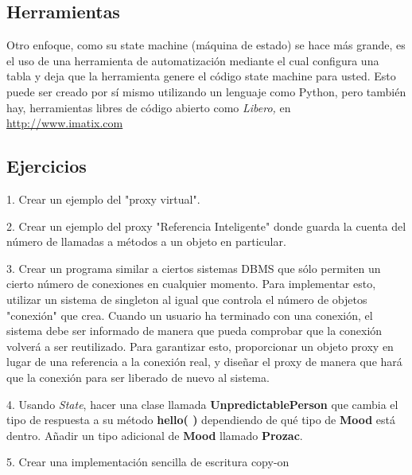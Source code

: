 \subsection*{Herramientas}
\label{subsec:Herramientas}

Otro enfoque, como su state machine (máquina de estado) se hace más grande, es el uso de una herramienta de automatización mediante el cual configura una tabla y deja que la herramienta genere el código state machine para usted. Esto puede ser creado por sí mismo utilizando un lenguaje como Python, pero también hay, herramientas libres de código abierto como \textit{ Libero,} en \textcolor[rgb]{0.2,0.5,0.7}{\underline{http://www.imatix.com}} \newline 


\subsection*{Ejercicios}
\label{subsec:Ejercicios}

1. Crear un ejemplo del "proxy virtual". \newline

2. Crear un ejemplo del proxy "Referencia Inteligente" donde guarda la cuenta del número de llamadas a métodos a un objeto en particular. \newline

3. Crear un programa similar a ciertos sistemas DBMS que sólo permiten un cierto número de conexiones en cualquier momento. Para implementar esto, utilizar un sistema de singleton al igual que controla el número de objetos "conexión" que crea. Cuando un usuario ha terminado con una conexión, el sistema debe ser informado de manera que pueda comprobar que la conexión volverá a ser reutilizado. Para garantizar esto, proporcionar un objeto proxy en lugar de una referencia a la conexión real, y diseñar el proxy de manera que hará que la conexión para ser liberado de nuevo al sistema.   \newline

4. Usando \textit{State}, hacer una clase llamada \textbf{UnpredictablePerson} que cambia el tipo de respuesta a su método \textbf{hello( )} dependiendo de qué tipo de \textbf{Mood} está dentro. Añadir un tipo adicional de \textbf{Mood} llamado \textbf{Prozac}.  \newline

5. Crear una implementación sencilla de escritura copy-on   \newline

